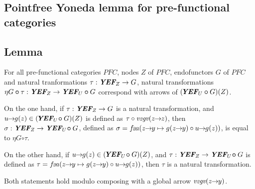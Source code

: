 \documentclass[11pt]{article}
\newcommand{\bcirc}{\bm{\circ}}
\newcommand{\YEF}{\mbox{\bf {\em YEF}}}
\newcommand{\fta}{\mbox{$f$\!{\scriptsize {\em 2}}$a$}}
\newcommand{\vtgv}{\mbox{{\normalsize {\em v}}{\scriptsize {\em 2}}{\normalsize {\em gv}}}}
\newcommand{\arrow}[2]{#1\!\!\rightarrow\!\!#2}
\newcommand{\lemm}{\subsection{Lemma}\begingroup\rm}
\def\edefn{\endgroup\par\pagebreak[2]\addvspace{\medskipamount}}
\let\elemm=\edefn
\begin{document}
\subsection{Pointfree Yoneda lemma for pre-functional categories}

\lemm\label{Pointfree Yoneda lemma for pre-functional categories}

For all pre-functional categories $P\!F\!C$, nodes $Z$ of $P\!F\!C$, endofunctors $G$ of $P\!F\!C$ and natural
tranformations $\tau: \YEF_{Z} \rightarrow G$, natural transformations
$\eta G \bcirc \tau: \YEF_{Z} \rightarrow \YEF_{U} \bcirc G$ correspond with arrows of $(\!\YEF_{U} \bcirc G)(Z)$.

On the one hand, if $\tau: \YEF_{Z} \rightarrow G$ is a natural transformation, and 
$\arrow{u}{g(z)} \in (\!\YEF_{U} \!\bcirc G)(Z)$ is defined as $\tau \circ \vtgv(\arrow{z}{z})$, then
$\sigma: \YEF_{Z} \rightarrow \YEF_{U} \!\bcirc G$, defined as
$\sigma = \fta(\arrow{z}{y} \mapsto g(\arrow{z}{y}) \circ \arrow{u}{g(z)})$, is equal to $\eta G \bcirc \tau$. 

On the other hand, if $\arrow{u}{g(z)} \in (\!\YEF_{U} \!\bcirc G)(Z)$, and
$\tau: \YEF_{Z} \rightarrow \YEF_{U} \!\bcirc G$ is defined as 
$\tau = \fta(\arrow{z}{y} \mapsto g(\arrow{z}{y}) \circ \arrow{u}{g(z)})$, then $\tau$ is a natural transformation.
\elemm

Both statements hold modulo composing with a global arrow $\vtgv(\arrow{z}{y})$.

\clearpage
\end{document}
